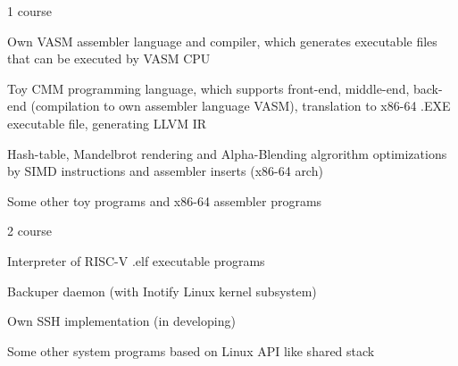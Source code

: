 
\begin{cventries}

  \cventry
    {} {1 course}
    {} {}
    {
      \begin{cvitems} %
        \vspace{-3mm}
        \item {Own VASM assembler language and compiler, which generates executable files that can be executed by VASM CPU}
      	\item {Toy CMM programming language, which supports front-end, middle-end, back-end (compilation to own assembler language VASM), translation to x86-64 .EXE executable file, generating LLVM IR}
      	\item {Hash-table, Mandelbrot rendering and Alpha-Blending algrorithm optimizations by SIMD instructions and assembler inserts (x86-64 arch)}
      	\item {Some other toy programs and x86-64 assembler programs}
      	\vspace{2mm}
      \end{cvitems}
    } 

  \cventry
    {} {2 course}
    {} {}
    {
      \begin{cvitems} %
        \vspace{-3mm}
      	\item {Interpreter of RISC-V .elf executable programs}
      	\item {Backuper daemon (with Inotify Linux kernel subsystem)}
      	\item {Own SSH implementation (in developing)}
      	\item {Some other system programs based on Linux API like shared stack}
      \end{cvitems}
    }

\end{cventries}
